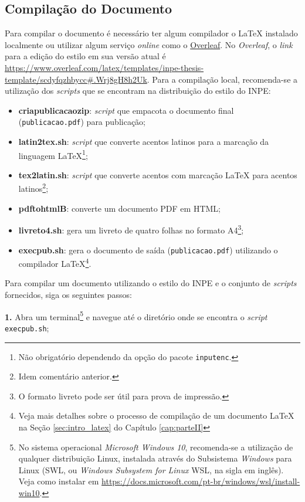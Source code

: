 \subsection{Compilação do Documento}
\label{sec:compilacao}

Para compilar o documento é necessário ter algum compilador o \LaTeX{} instalado localmente ou utilizar algum serviço \textit{online} como o \href{https://www.overleaf.com/}{Overleaf}. No \textit{Overleaf}, o \textit{link} para a edição do estilo em sua versão atual é \url{https://www.overleaf.com/latex/templates/inpe-thesis-template/scdyfqzhbycc#.Wrj8gH8h2Uk}. Para a compilação local, recomenda-se a utilização dos \textit{scripts} que se encontram na distribuição do estilo do INPE:

\begin{itemize}
    \item \textbf{criapublicacaozip}: \textit{script} que empacota o documento final ({\tt publicacao.pdf}) para publicação;
    \item \textbf{latin2tex.sh}: \textit{script} que converte acentos latinos para a marcação da linguagem \LaTeX{}\footnote{Não obrigatório dependendo da opção do pacote {\tt inputenc}.};
    \item \textbf{tex2latin.sh}: \textit{script} que converte acentos com marcação \LaTeX{} para acentos latinos\footnote{Idem comentário anterior.};
    \item \textbf{pdftohtmlB}: converte um documento PDF em HTML;
    \item \textbf{livreto4.sh}: gera um livreto de quatro folhas no formato A4\footnote{O formato livreto pode ser útil para prova de impressão.};
    \item \textbf{execpub.sh}: gera o documento de saída ({\tt publicacao.pdf}) utilizando o compilador \LaTeX{}\footnote{Veja mais detalhes sobre o processo de compilação de um documento \LaTeX{} na Seção \ref{sec:intro_latex} do Capítulo \ref{cap:parteII}}. 
\end{itemize}

Para compilar um documento utilizando o estilo do INPE e o conjunto de \textit{scripts} fornecidos, siga os seguintes passos:

\textbf{1.} Abra um terminal\footnote{No sistema operacional \textit{Microsoft Windows 10}, recomenda-se a utilização de qualquer distribuição Linux, instalada através do Subsistema \textit{Windows} para Linux (SWL, ou \textit{Windows Subsystem for Linux} WSL, na sigla em inglês). Veja como instalar em \url{https://docs.microsoft.com/pt-br/windows/wsl/install-win10}.} e navegue até o diretório onde se encontra o \textit{script} {\tt execpub.sh};

